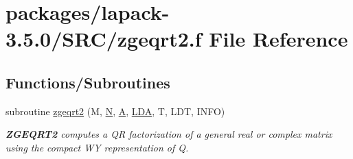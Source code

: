 \hypertarget{zgeqrt2_8f}{}\section{packages/lapack-\/3.5.0/\+S\+R\+C/zgeqrt2.f File Reference}
\label{zgeqrt2_8f}
\subsection*{Functions/\+Subroutines}
\begin{DoxyCompactItemize}
\item 
subroutine \hyperlink{group__complex16GEcomputational_gaf3cc243f2912f6bf569c4ec61e071413}{zgeqrt2} (M, \hyperlink{polmisc_8c_a0240ac851181b84ac374872dc5434ee4}{N}, \hyperlink{classA}{A}, \hyperlink{example__user_8c_ae946da542ce0db94dced19b2ecefd1aa}{L\+D\+A}, T, L\+D\+T, I\+N\+F\+O)
\begin{DoxyCompactList}\small\item\em {\bfseries Z\+G\+E\+Q\+R\+T2} computes a Q\+R factorization of a general real or complex matrix using the compact W\+Y representation of Q. \end{DoxyCompactList}\end{DoxyCompactItemize}
